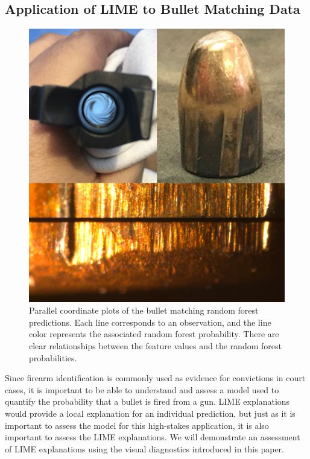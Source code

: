 \documentclass[AMS,STIX2COL]{WileyNJD-v2}\usepackage[]{graphicx}\usepackage[]{color}
\newenvironment{knitrout}{}{} %
\begin{document}
\subsection{Application of LIME to Bullet Matching Data}

\begin{figure}[!thp]
\begin{knitrout}
\color{fgcolor}

{\centering \includegraphics[width=6.5in]{figure-static/figure-08-1} 

}


\end{knitrout}
\caption{Parallel coordinate plots of the bullet matching random forest predictions. Each line corresponds to an observation, and the line color represents the associated random forest probability. There are clear relationships between the feature values and the random forest probabilities.}
\label{fig:figure-08}
\end{figure}

Since firearm identification is commonly used as evidence for convictions in court cases, it is important to be able to understand and assess a model used to quantify the probability that a bullet is fired from a gun. LIME explanations would provide a local explanation for an individual prediction, but just as it is important to assess the model for this high-stakes application, it is also important to assess the LIME explanations. We will demonstrate an assessment of LIME explanations using the visual diagnostics introduced in this paper.
\end{document}
